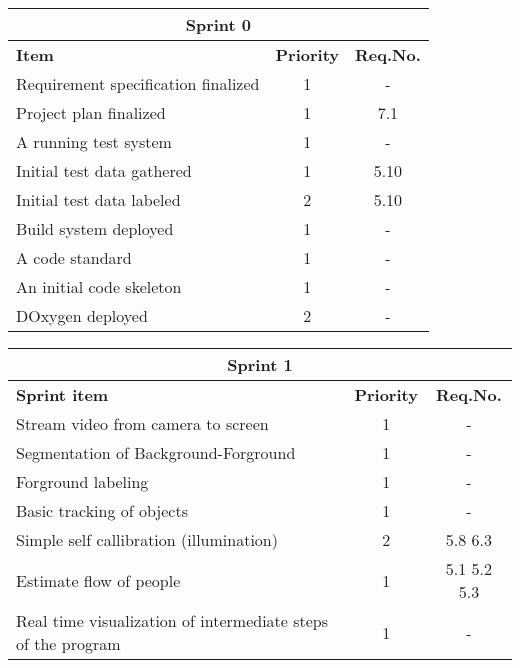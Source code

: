 \label{sprint0}
\begin{center}
	\begin{Large}
	\begin{tabular}{|p{10.5cm}|c|c|}
		\hline
		\multicolumn{3}{|c|}{\textbf{Sprint 0}} \\
		\hline
		\large{\textbf{Item}} & \large{\textbf{Priority}} & \large{\textbf{Req.No.}} \\
		\hline
		\large{Requirement specification finalized} & \large{1} & - \\
		\hline
		\large{Project plan finalized} & \large{1} & 7.1 \\
		\hline
		\large{A running test system} & \large{1} & - \\
		\hline
		\large{Initial test data gathered} & \large{1} & 5.10 \\
		\hline
		\large{Initial test data labeled} & \large{2} & 5.10 \\
		\hline
		\large{Build system deployed} & \large{1} & - \\
		\hline	
		\large{A code standard} & \large{1} & - \\
		\hline	
		\large{An initial code skeleton} & \large{1} & - \\
		\hline	
		\large{DOxygen deployed} & \large{2} & - \\
		\hline		
	\end{tabular}
	\end{Large}
\end{center}



\label{sprint1}
\begin{center}
	\begin{Large}
	\begin{tabular}{|p{10.5cm}|c|c|}
		\hline
		\multicolumn{3}{|c|}{\textbf{Sprint 1}} \\
		\hline
		\large{\textbf{Sprint item}} & \large{\textbf{Priority}} & \large{\textbf{Req.No.}} \\
		\hline
		\large{Stream video from camera to screen} & \large{1} & - \\
		\hline
		\large{Segmentation of Background-Forground} & \large{1} & - \\
		\hline
		\large{Forground labeling} & \large{1} & - \\
		\hline
		\large{Basic tracking of objects} & \large{1} & - \\
		\hline
		\large{Simple self callibration (illumination)} & \large{2} & 5.8 6.3 \\
		\hline
		\large{Estimate flow of people} & \large{1} & 5.1 5.2 5.3 \\
		\hline
		\large{Real time visualization of intermediate steps of the program} & \large{1} & - \\
		\hline
	\end{tabular}
	\end{Large}
\end{center}



